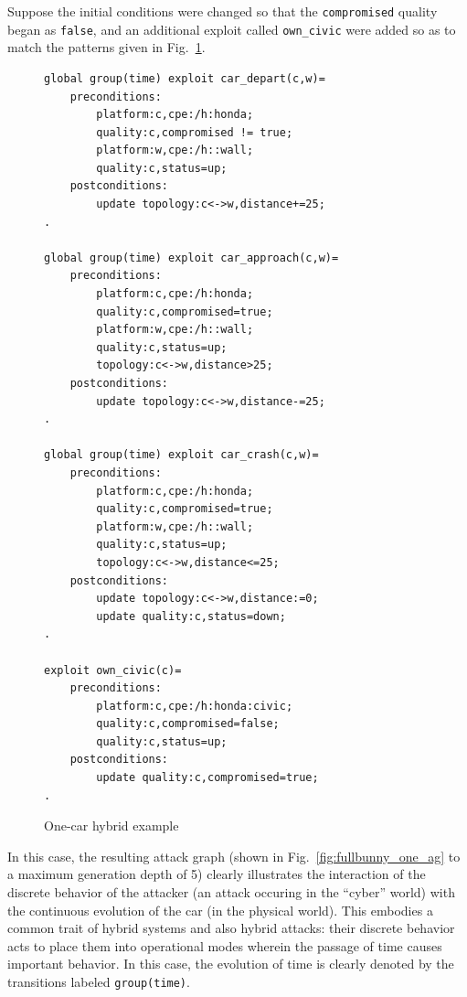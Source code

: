 Suppose the initial conditions were changed so that the \texttt{compromised}
quality began as \texttt{false}, and an additional exploit called \texttt{own_civic}
were added so as to match the patterns given in Fig.~\ref{fig:fullbunny_one_xp}.

\begin{figure}
\begin{lstlisting}
global group(time) exploit car_depart(c,w)=
    preconditions:
        platform:c,cpe:/h:honda;
        quality:c,compromised != true;
        platform:w,cpe:/h::wall;
        quality:c,status=up;
    postconditions:
        update topology:c<->w,distance+=25;
.

global group(time) exploit car_approach(c,w)=
    preconditions:
        platform:c,cpe:/h:honda;
        quality:c,compromised=true;
        platform:w,cpe:/h::wall;
        quality:c,status=up;
        topology:c<->w,distance>25;
    postconditions:
        update topology:c<->w,distance-=25;
.

global group(time) exploit car_crash(c,w)=
    preconditions:
        platform:c,cpe:/h:honda;
        quality:c,compromised=true;
        platform:w,cpe:/h::wall;
        quality:c,status=up;
        topology:c<->w,distance<=25;
    postconditions:
        update topology:c<->w,distance:=0;
        update quality:c,status=down;
.

exploit own_civic(c)=
    preconditions:
        platform:c,cpe:/h:honda:civic;
        quality:c,compromised=false;
        quality:c,status=up;
    postconditions:
        update quality:c,compromised=true;
.
\end{lstlisting}
\caption{One-car hybrid example}
\label{fig:fullbunny_one_xp}
\end{figure}

In this case, the resulting attack graph (shown in 
Fig.~\ref{fig:fullbunny_one_ag} to a maximum generation depth of 5) clearly
illustrates the interaction of the discrete behavior of the attacker (an
attack occuring in the ``cyber'' world) with the continuous evolution of the
car (in the physical world). This embodies a common trait of hybrid systems
and also hybrid attacks: their discrete behavior acts to place them into
operational modes wherein the passage of time causes important behavior. In
this case, the evolution of time is clearly denoted by the transitions labeled
\texttt{group(time)}.

